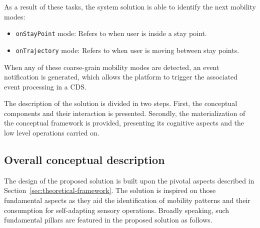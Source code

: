 \documentclass[ENG,PhD]{cinvestav}
\begin{document}
As a result of these tasks, the system solution is able to identify the next mobility modes:
\begin{itemize}
  \item \texttt{onStayPoint} mode: Refers to when user is inside a stay point.
  \item \texttt{onTrajectory} mode: Refers to when user is moving between stay points.
\end{itemize}

When any of these coarse-grain mobility modes are detected, an event notification is generated, which allows the platform to trigger the associated event processing in a CDS.

The description of the solution is divided in two steps.
First, the conceptual components and their interaction is presented.
Secondly, the materialization of the conceptual framework is provided, presenting its cognitive aspects and the low level operations carried on.

\subsection{Overall conceptual description}
The design of the proposed solution is built upon the pivotal aspects described in Section~\ref{sec:theoretical-framework}.
The solution is inspired on those fundamental aspects as they aid the identification of mobility patterns and their consumption for self-adapting sensory operations.
Broadly speaking, such fundamental pillars are featured in the proposed solution as follows.
\end{document}
